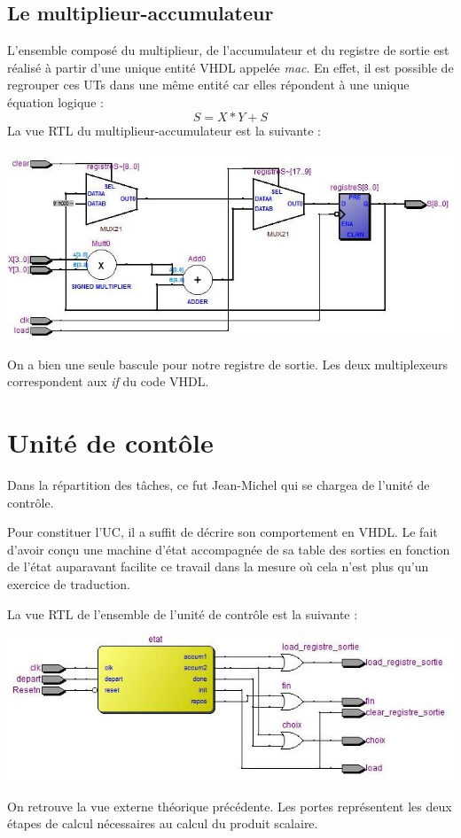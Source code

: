 \documentclass[a4paper]{report}
\begin{document}
\section{Le multiplieur-accumulateur}
L'ensemble composé du multiplieur, de l'accumulateur et du registre de sortie est réalisé à partir d'une unique entité VHDL appelée \emph{mac}.
En effet, il est possible de regrouper ces UTs dans une même entité car elles répondent à une unique équation logique :
\[
S = X*Y+S
\]
La vue RTL du multiplieur-accumulateur est la suivante :
\begin{center}
	\includegraphics[scale=0.7]{mac_instance_mac.jpg}
\end{center}
On a bien une seule bascule pour notre registre de sortie. Les deux multiplexeurs correspondent aux \emph{if} du code VHDL.
\chapter{Unité de contôle}
Dans la répartition des tâches, ce fut Jean-Michel qui se chargea de l'unité de contrôle.

Pour constituer l'UC, il a suffit de décrire son comportement en VHDL.
Le fait d'avoir conçu une machine d'état accompagnée de sa table des sorties en fonction de l'état auparavant facilite ce travail dans la mesure où cela n'est plus qu'un exercice de traduction.

La vue RTL de l'ensemble de l'unité de contrôle est la suivante :
\begin{center}
	\includegraphics[scale=0.7]{uc_instance_uc.jpg}
\end{center}
On retrouve la vue externe théorique précédente.
Les portes  représentent les deux étapes de calcul nécessaires au calcul du produit scalaire.
\end{document}
